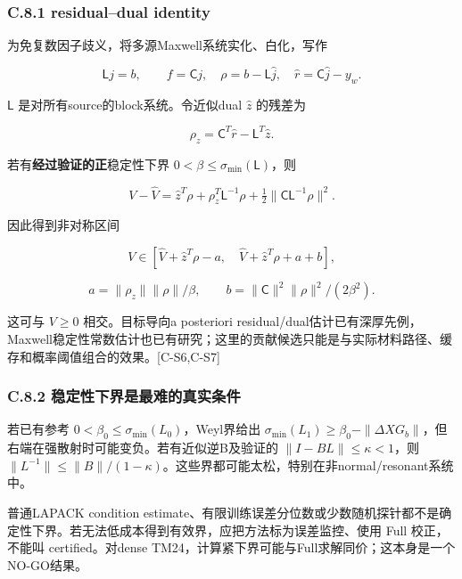 \documentclass[
  11pt,
  a4paper,
]{article}
\begin{document}
\hypertarget{c.8.1-residualdual-identity}{%
\subsubsection{C.8.1 residual--dual
identity}\label{c.8.1-residualdual-identity}}

为免复数因子歧义，将多源Maxwell系统实化、白化，写作

\[
\mathsf L j=b,\qquad f=\mathsf C j,
\quad\rho=b-\mathsf L\widehat j,\quad\widehat r=\mathsf C\widehat j-y_w.
\]

\(\mathsf L\) 是对所有source的block系统。令近似dual \(\widehat z\)
的残差为

\[
\rho_z=\mathsf C^T\widehat r-\mathsf L^T\widehat z.
\]

若有\textbf{经过验证的正}稳定性下界
\(0<\beta\le\sigma_{\min}(\mathsf L)\)，则

\[
V-\widehat V
=\widehat z^T\rho+\rho_z^T\mathsf L^{-1}\rho
+\tfrac12\|\mathsf C\mathsf L^{-1}\rho\|^2.
\]

因此得到非对称区间

\[
V\in\left[\widehat V+\widehat z^T\rho-a,\quad
\widehat V+\widehat z^T\rho+a+b\right],
\]

\[
a=\|\rho_z\|\|\rho\|/\beta,\qquad
b=\|\mathsf C\|^2\|\rho\|^2/(2\beta^2).
\]

这可与 \(V\ge0\) 相交。目标导向a posteriori
residual/dual估计已有深厚先例，Maxwell稳定性常数估计也已有研究；这里的贡献候选只能是与实际材料路径、缓存和概率阈值组合的效果。{[}C-S6,C-S7{]}

\hypertarget{c.8.2-ux7a33ux5b9aux6027ux4e0bux754cux662fux6700ux96beux7684ux771fux5b9eux6761ux4ef6}{%
\subsubsection{C.8.2
稳定性下界是最难的真实条件}\label{c.8.2-ux7a33ux5b9aux6027ux4e0bux754cux662fux6700ux96beux7684ux771fux5b9eux6761ux4ef6}}

若已有参考 \(0<\beta_0\le\sigma_{\min}(L_0)\)，Weyl界给出
\(\sigma_{\min}(L_1)\ge\beta_0-\|\Delta XG_b\|\)，但右端在强散射时可能变负。若有近似逆B及验证的
\(\|I-BL\|\le\kappa<1\)，则
\(\|L^{-1}\|\le\|B\|/(1-\kappa)\)。这些界都可能太松，特别在非normal/resonant系统中。

普通LAPACK condition
estimate、有限训练误差分位数或少数随机探针都不是确定性下界。若无法低成本得到有效界，应把方法标为误差监控、使用
Full 校正，不能叫 certified。对dense
TM24，计算紧下界可能与Full求解同价；这本身是一个NO-GO结果。
\end{document}
